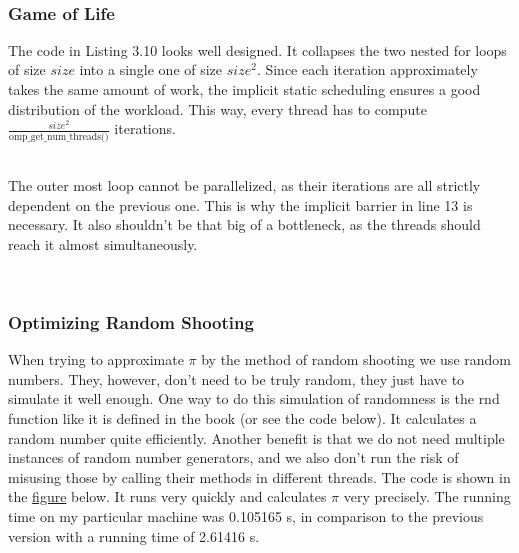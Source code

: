 \documentclass[../../main.tex]{subfiles}
\begin{document}
~\\
\subsubsection{Game of Life}
The code in Listing 3.10 looks well designed.
It collapses the two nested for loops of size $size$ into a single one of size $size^2$.
Since each iteration approximately takes the same amount of work, the implicit static scheduling ensures a good distribution of the workload.
This way, every thread has to compute \( \frac{size^2}{\text{omp\_get\_num\_threads()}} \) iterations.

~\\
The outer most loop cannot be parallelized, as their iterations are all strictly dependent on the previous one.
This is why the implicit barrier in line 13 is necessary.
It also shouldn't be that big of a bottleneck, as the threads should reach it almost simultaneously.


~\\
\subsubsection{Optimizing Random Shooting}
When trying to approximate $\pi$ by the method of random shooting we use random numbers.
They, however, don't need to be truly random, they just have to simulate it well enough.
One way to do this simulation of randomness is the rnd function like it is defined in the book (or see the code below).
It calculates a random number quite efficiently.
Another benefit is that we do not need multiple instances of random number generators, and we also don't run the risk of misusing those by calling their methods in different threads.
The code is shown in the \hyperref[fig:calculate_pi_v2]{figure} below.
It runs very quickly and calculates $\pi$ very precisely.
The running time on my particular machine was 0.105165 s, in comparison to the previous version with a running time of 2.61416 s.
\end{document}
